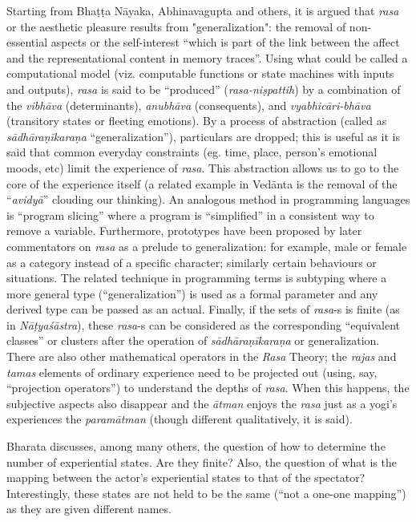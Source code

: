 Starting from Bhaṭṭa Nāyaka, Abhinavagupta and others, it is argued that \textsl{rasa} or the aesthetic pleasure results from "generalization": the removal of non-essential aspects or the self-interest “which is part of the link between the affect and the representational content in memory traces”. Using what could be called a computational model (viz. computable functions or state machines with inputs and outputs), \textsl{rasa} is said to be “produced” (\textsl{rasa-niṣpattih}) by a combination of the \textsl{vibhāva} (determinants), \textsl{anubhāva} (consequents), and \textsl{vyabhicāri-bhāva} (transitory states or fleeting emotions). By a process of abstraction (called as \textsl{sādhāraṇīkaraṇa} “generalization”), particulars are dropped; this is useful as it is said that common everyday constraints (eg. time, place, person’s emotional moods, etc) limit the experience of \textsl{rasa}. This abstraction allows us to go to the core of the experience itself (a related example in Vedānta is the removal of the “\textsl{avidyā}” clouding our thinking). An analogous method in programming languages is “program slicing” where a program is “simplified” in a consistent way to remove a variable. Furthermore, prototypes have been proposed by later commentators on \textsl{rasa} as a prelude to generalization: for example, male or female as a category instead of a specific character; similarly certain behaviours or situations. The related technique in programming terms is subtyping where a more general type (“generalization”) is used as a formal parameter and any derived type can be passed as an actual. Finally, if the sets of \textsl{rasa}-s is finite (as in \textsl{Nāṭyaśāstra}), these \textsl{rasa}-s can be considered as the corresponding “equivalent classes” or clusters after the operation of \textsl{sādhāraṇīkaraṇa} or generalization. There are also other mathematical operators in the \textsl{Rasa} Theory; the \textsl{rajas} and \textsl{tamas} elements of ordinary experience need to be projected out (using, say, “projection operators”) to understand the depths of \textsl{rasa}. When this happens, the subjective aspects also disappear and the \textsl{ātman} enjoys the \textsl{rasa} just as a yogi’s experiences the \textsl{paramātman} (though different qualitatively, it is said).

Bharata discusses, among many others, the question of how to determine the number of experiential states. Are they finite? Also, the question of what is the mapping between the actor’s experiential states to that of the spectator? Interestingly, these states are not held to be the same (“not a one-one mapping”) as they are given different names.

